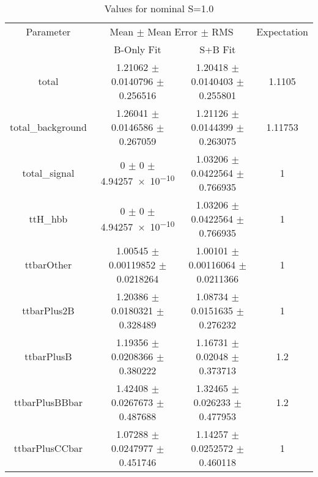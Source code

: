 \begin{table}
\centering
\caption{Values for nominal S=1.0}
\begin{tabular}{cccc}
\toprule
Parameter & \multicolumn{2}{c}{Mean $\pm$ Mean Error $\pm$ RMS} & Expectation\\
 & B-Only Fit & S+B Fit & \\
\midrule
total & \num{1.21062} $\pm$ \num{0.0140796} $\pm$ \num{0.256516} & \num{1.20418} $\pm$ \num{0.0140403} $\pm$ \num{0.255801} & \num{1.1105}\\
total\_background & \num{1.26041} $\pm$ \num{0.0146586} $\pm$ \num{0.267059} & \num{1.21126} $\pm$ \num{0.0144399} $\pm$ \num{0.263075} & \num{1.11753}\\
total\_signal & \num{0} $\pm$ \num{0} $\pm$ \num{4.94257e-10} & \num{1.03206} $\pm$ \num{0.0422564} $\pm$ \num{0.766935} & \num{1}\\
ttH\_hbb & \num{0} $\pm$ \num{0} $\pm$ \num{4.94257e-10} & \num{1.03206} $\pm$ \num{0.0422564} $\pm$ \num{0.766935} & \num{1}\\
ttbarOther & \num{1.00545} $\pm$ \num{0.00119852} $\pm$ \num{0.0218264} & \num{1.00101} $\pm$ \num{0.00116064} $\pm$ \num{0.0211366} & \num{1}\\
ttbarPlus2B & \num{1.20386} $\pm$ \num{0.0180321} $\pm$ \num{0.328489} & \num{1.08734} $\pm$ \num{0.0151635} $\pm$ \num{0.276232} & \num{1}\\
ttbarPlusB & \num{1.19356} $\pm$ \num{0.0208366} $\pm$ \num{0.380222} & \num{1.16731} $\pm$ \num{0.02048} $\pm$ \num{0.373713} & \num{1.2}\\
ttbarPlusBBbar & \num{1.42408} $\pm$ \num{0.0267673} $\pm$ \num{0.487688} & \num{1.32465} $\pm$ \num{0.026233} $\pm$ \num{0.477953} & \num{1.2}\\
ttbarPlusCCbar & \num{1.07288} $\pm$ \num{0.0247977} $\pm$ \num{0.451746} & \num{1.14257} $\pm$ \num{0.0252572} $\pm$ \num{0.460118} & \num{1}\\
\bottomrule
\end{tabular}
\end{table}
